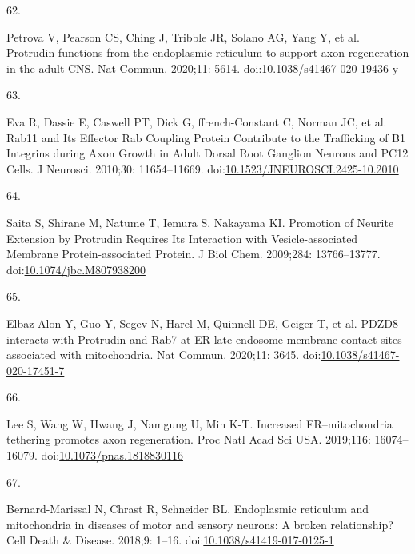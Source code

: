 \documentclass[
  12pt,
  a4paper,
]{book}
\newlength{\cslhangindent}
\newlength{\csllabelwidth}
\newlength{\cslentryspacingunit} %
\newenvironment{CSLReferences}[2] %
 {%
  \setlength{\parindent}{0pt}
  \ifodd #1
  \let\oldpar\par
  \def\par{\hangindent=\cslhangindent\oldpar}
  \fi
  \setlength{\parskip}{#2\cslentryspacingunit}
 }%
 {}
\newcommand{\CSLLeftMargin}[1]{\parbox[t]{\csllabelwidth}{#1}}
\newcommand{\CSLRightInline}[1]{\parbox[t]{\linewidth - \csllabelwidth}{#1}\break}
\begin{document}
\begin{CSLReferences}{0}{0}
\leavevmode{}%
\CSLLeftMargin{62. }%
\CSLRightInline{Petrova V, Pearson CS, Ching J, Tribble JR, Solano AG, Yang Y, et al. Protrudin functions from the endoplasmic reticulum to support axon regeneration in the adult {CNS}. Nat Commun. 2020;11: 5614. doi:\href{https://doi.org/10.1038/s41467-020-19436-y}{10.1038/s41467-020-19436-y}}

\leavevmode{}%
\CSLLeftMargin{63. }%
\CSLRightInline{Eva R, Dassie E, Caswell PT, Dick G, ffrench-Constant C, Norman JC, et al. Rab11 and {Its Effector Rab Coupling Protein Contribute} to the {Trafficking} of Β1 {Integrins} during {Axon Growth} in {Adult Dorsal Root Ganglion Neurons} and {PC12 Cells}. J Neurosci. 2010;30: 11654--11669. doi:\href{https://doi.org/10.1523/JNEUROSCI.2425-10.2010}{10.1523/JNEUROSCI.2425-10.2010}}

\leavevmode{}%
\CSLLeftMargin{64. }%
\CSLRightInline{Saita S, Shirane M, Natume T, Iemura S, Nakayama KI. Promotion of {Neurite Extension} by {Protrudin Requires Its Interaction} with {Vesicle-associated Membrane Protein-associated Protein}. J Biol Chem. 2009;284: 13766--13777. doi:\href{https://doi.org/10.1074/jbc.M807938200}{10.1074/jbc.M807938200}}

\leavevmode{}%
\CSLLeftMargin{65. }%
\CSLRightInline{Elbaz-Alon Y, Guo Y, Segev N, Harel M, Quinnell DE, Geiger T, et al. {PDZD8} interacts with {Protrudin} and {Rab7} at {ER-late} endosome membrane contact sites associated with mitochondria. Nat Commun. 2020;11: 3645. doi:\href{https://doi.org/10.1038/s41467-020-17451-7}{10.1038/s41467-020-17451-7}}

\leavevmode{}%
\CSLLeftMargin{66. }%
\CSLRightInline{Lee S, Wang W, Hwang J, Namgung U, Min K-T. Increased {ER}--mitochondria tethering promotes axon regeneration. Proc Natl Acad Sci USA. 2019;116: 16074--16079. doi:\href{https://doi.org/10.1073/pnas.1818830116}{10.1073/pnas.1818830116}}

\leavevmode{}%
\CSLLeftMargin{67. }%
\CSLRightInline{Bernard-Marissal N, Chrast R, Schneider BL. Endoplasmic reticulum and mitochondria in diseases of motor and sensory neurons: A broken relationship? Cell Death \& Disease. 2018;9: 1--16. doi:\href{https://doi.org/10.1038/s41419-017-0125-1}{10.1038/s41419-017-0125-1}}


\end{CSLReferences}
\end{document}
